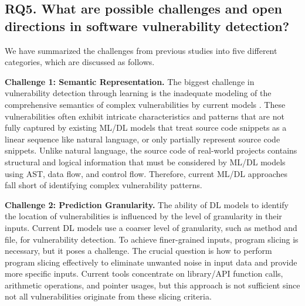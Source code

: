 \subsection{RQ5. What are possible challenges and open directions in software vulnerability detection?} 
%
We have summarized the challenges from previous studies into five different categories, %
which are discussed as follows. 

%


\noindent \textbf{Challenge 1: Semantic Representation.} 
The biggest challenge in vulnerability detection through learning is the inadequate modeling of the comprehensive semantics of complex vulnerabilities by current models \cite{dam2018automatic, dam2017automatic, shippey2019automatically, wang2016automatically, jeon2021autovas, phan2017convolutional, hoang2019deepjit, cheng2021deepwukong, zhou2019devign, wu2021peculiar,li2017software, li2021sysevr, li2021vuldeelocator, duan2019vulsniper, zheng2021vulspg, zhuang2022just, cheng2022path, liu2021smart,yang2022source, nguyen2022mando, nguyen2022mando2}. These vulnerabilities often exhibit intricate characteristics and patterns that are not fully captured by existing ML/DL models that treat source code snippets as a linear sequence like natural language, or only partially represent source code snippets. Unlike natural language, the source code of real-world projects contains structural and logical information that must be considered by ML/DL models using AST, data flow, and control flow. Therefore, current ML/DL approaches fall short of identifying complex vulnerability patterns.

\noindent \textbf{Challenge 2: Prediction Granularity.}
The ability of DL models to identify the location of vulnerabilities is influenced by the level of granularity in their inputs. Current DL models use a coarser level of granularity, such as method and file, for vulnerability detection. To achieve finer-grained inputs, program slicing is necessary, but it poses a challenge. The crucial question is how to perform program slicing effectively to eliminate unwanted noise in input data and provide more specific inputs. Current tools \cite{pascarella2019fine,
dinella2020hoppity, fu2022linevul, zou2019mu, cao2022mvd, lin2017poster, li2021vulnerability, ding2022velvet,
zou2022mvulpreter} concentrate on library/API function calls, arithmetic operations, and pointer usages, but this approach is not sufficient since not all vulnerabilities originate from these slicing criteria.


